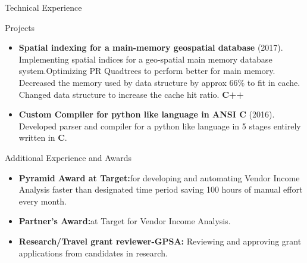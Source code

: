 \documentclass[]{nakulcv}
\begin{document}
    \begin{cvsection}{Technical Experience}
        \begin{cvsubsection}{Projects}{}{}
            \begin{itemize}
                \item \textbf{Spatial indexing for a main-memory geospatial database}
                    (2017). Implementing spatial indices for a geo-spatial main memory
                    database system.Optimizing PR Quadtrees to perform better for main
                    memory. Decreased the memory used by data structure by approx 66\% to
                    fit in cache. Changed data structure to increase the cache hit ratio. \textbf{C++}
                \item \textbf{Custom Compiler for python like language in ANSI C} (2016). Developed parser and compiler for a python like language in 5 stages entirely written in \textbf{C}.
            \end{itemize}
        \end{cvsubsection}
    \end{cvsection}

    \begin{cvsection}{Additional Experience and Awards}
        \begin{cvsubsection}{}{}{}	
            \begin{itemize}
                \item \textbf{Pyramid Award at Target:}for developing and automating Vendor Income Analysis faster than designated time period saving 100 hours of manual effort every month.
                \item \textbf{Partner's Award:}at Target for Vendor Income Analysis. 
                \item \textbf{Research/Travel grant reviewer-GPSA:} Reviewing and approving grant applications from candidates in research. 
            \end{itemize}
        \end{cvsubsection}
    \end{cvsection}
\end{document}
